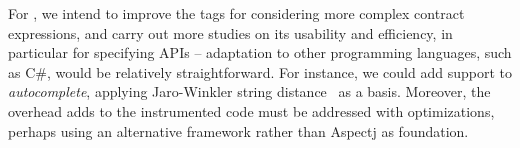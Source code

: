 For \contractjdoc{}, we intend to improve the tags for considering more complex contract expressions, and carry out more studies on its usability and efficiency, in particular for specifying APIs -- adaptation to other programming languages, such as C\#, would be relatively straightforward. 
For instance, we could add support to \emph{autocomplete}, applying Jaro-Winkler string distance~\cite{jaro,winkler99} as a basis.
Moreover, the overhead \contractjdoc{} adds to the instrumented code must be addressed with optimizations, perhaps using an alternative framework rather than Aspectj as foundation. 















